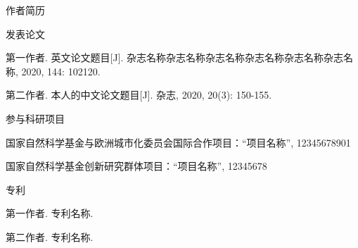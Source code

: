 \begin{ResumePublications}
	\begin{ResumeList}
		\item 作者简历\par
		\item 发表论文
		\begin{PublicationsList}
			\item 第一作者. 英文论文题目\hspace{0em}[J]. 杂志名称杂志名称杂志名称杂志名称杂志名称杂志名称, 2020, 144: 102120.
			\item 第二作者. 本人的中文论文题目\hspace{0em}[J]. 杂志, 2020, 20(3): 150-155.
		\end{PublicationsList}
		\item 参与科研项目
		\begin{PublicationsList}
			\item 国家自然科学基金与欧洲城市化委员会国际合作项目：“项目名称”, 12345678901
			\item 国家自然科学基金创新研究群体项目：“项目名称”, 12345678
		\end{PublicationsList}
		\item 专利
		\begin{PublicationsList}
			\item 第一作者. 专利名称.
			\item 第二作者. 专利名称.
		\end{PublicationsList}
	\end{ResumeList}
\end{ResumePublications}
